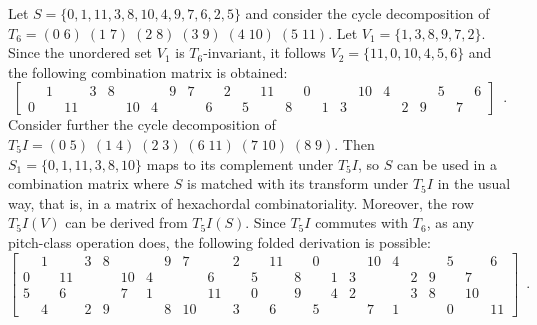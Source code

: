 \begin{example}
    \cite[215]{Starr1984}
    \label{ex:derivation-folded}
    Let $S = \{ 0, 1, 11, 3, 8, 10, 4, 9, 7, 6, 2, 5 \}$ and consider the cycle decomposition of $T_6 = (0 \; 6) \; (1 \; 7) \; (2 \; 8) \; (3 \; 9) \; (4 \; 10) \; (5 \; 11)$. Let $V_1 = \{ 1, 3, 8, 9, 7, 2 \}$. Since the unordered set $V_1$ is $T_6$-invariant, it follows $V_2 = \{ 11, 0, 10, 4, 5, 6 \}$ and the following combination matrix is obtained:
    \begin{equation}
        \left[
        \begin{array}{cccccccccccc|cccccccccccc}
            & 1 && 3 & 8 &&& 9 & 7 && 2 && 11 && 0 &&& 10 & 4 &&& 5 && 6 \\
            0 && 11 &&& 10 & 4 &&& 6 && 5 && 8 && 1 & 3 &&& 2 & 9 && 7 &  
        \end{array}
        \right] \enspace.
    \end{equation}
    Consider further the cycle decomposition of $T_5I = (0 \; 5) \; (1 \; 4) \; (2 \; 3) \; (6 \; 11) \; (7 \; 10) \; (8 \; 9)$. Then $S_1 = \{ 0, 1, 11, 3, 8, 10 \}$ maps to its complement under $T_5I$, so $S$ can be used in a combination matrix where $S$ is matched with its transform under $T_5I$ in the usual way, that is, in a matrix of hexachordal combinatoriality. Moreover, the row $T_5I(V)$ can be derived from $T_5I(S)$. Since $T_5I$ commutes with $T_6$, as any pitch-class operation does, the following folded derivation is possible:
    \begin{equation}
        \left[
        \begin{array}{cccccccccccc|cccccccccccc}
            & 1 && 3 & 8 &&& 9 & 7 && 2 && 11 && 0 &&& 10 & 4 &&& 5 && 6 \\
            0 && 11 &&& 10 & 4 &&& 6 && 5 && 8 && 1 & 3 &&& 2 & 9 && 7 & \\
            \hline
            5 && 6 &&& 7 & 1 &&& 11 && 0 && 9 && 4 & 2 &&& 3 & 8 && 10 & \\
            & 4 && 2 & 9 &&& 8 & 10 && 3 && 6 && 5 &&& 7 & 1 &&& 0 && 11
        \end{array}
        \right] \enspace.
    \end{equation}
\end{example}

